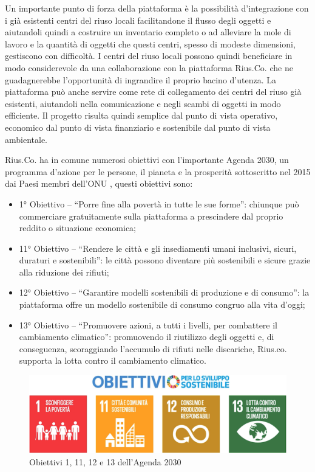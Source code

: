 Un importante punto di forza della piattaforma è la possibilità d'integrazione con i già esistenti centri del riuso locali facilitandone il flusso degli oggetti e aiutandoli quindi a costruire un inventario completo o ad alleviare la mole di lavoro e la quantità di oggetti che questi centri, spesso di modeste dimensioni, gestiscono con difficoltà. I centri del riuso locali possono quindi beneficiare in modo considerevole da una collaborazione con la piattaforma Rius.Co. che ne guadagnerebbe l'opportunità di ingrandire il proprio bacino d'utenza. 
La piattaforma può anche servire come rete di collegamento dei centri del riuso già esistenti, aiutandoli nella comunicazione e negli scambi di oggetti in modo efficiente. Il progetto risulta quindi semplice dal punto di vista operativo, economico dal punto di vista finanziario e sostenibile dal punto di vista ambientale. 
\medskip

Rius.Co. ha in comune numerosi obiettivi con l'importante Agenda 2030, un programma d'azione per le persone, il pianeta e la prosperità sottoscritto nel 2015 dai Paesi membri dell'ONU \cite{Agenda2030}, questi obiettivi sono: 
\begin{itemize}
    \item 1° Obiettivo – “Porre fine alla povertà in tutte le sue forme”: chiunque può commerciare gratuitamente sulla piattaforma a prescindere dal proprio reddito o situazione economica; 
    \item 11° Obiettivo – “Rendere le città e gli insediamenti umani inclusivi, sicuri, duraturi e sostenibili”: le città possono diventare più sostenibili e sicure grazie alla riduzione dei rifiuti; 
    \item 12° Obiettivo – “Garantire modelli sostenibili di produzione e di consumo”: la piattaforma offre un modello sostenibile di consumo congruo alla vita d'oggi; 
    \item 13° Obiettivo – “Promuovere azioni, a tutti i livelli, per combattere il cambiamento climatico”: promuovendo il riutilizzo degli oggetti e, di conseguenza, scoraggiando l'accumulo di rifiuti nelle discariche, Rius.co. supporta la lotta contro il cambiamento climatico. 
\end{itemize}
\begin{figure}[hb]
    \centering\includegraphics[scale=0.1]{images/agenda_2030.png}
    \caption{Obiettivi 1, 11, 12 e 13 dell'Agenda 2030}
\end{figure}
\clearpage
